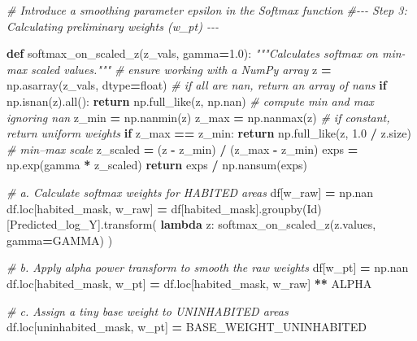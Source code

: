 \documentclass[
  12pt,
  oneside]{book}
\newenvironment{Shaded}{\begin{snugshade}}{\end{snugshade}}
\newcommand{\BuiltInTok}[1]{#1}
\newcommand{\CommentTok}[1]{\textcolor[rgb]{0.56,0.35,0.01}{\textit{#1}}}
\newcommand{\ControlFlowTok}[1]{\textcolor[rgb]{0.13,0.29,0.53}{\textbf{#1}}}
\newcommand{\FloatTok}[1]{\textcolor[rgb]{0.00,0.00,0.81}{#1}}
\newcommand{\KeywordTok}[1]{\textcolor[rgb]{0.13,0.29,0.53}{\textbf{#1}}}
\newcommand{\NormalTok}[1]{#1}
\newcommand{\OperatorTok}[1]{\textcolor[rgb]{0.81,0.36,0.00}{\textbf{#1}}}
\newcommand{\StringTok}[1]{\textcolor[rgb]{0.31,0.60,0.02}{#1}}
\begin{document}
\begin{Shaded}
\begin{Highlighting}[numbers=left,,]
\CommentTok{\# Introduce a smoothing parameter epsilon in the Softmax function}
\CommentTok{\#{-}{-}{-} Step 3: Calculating preliminary weights (w\_pt) {-}{-}{-}}

\KeywordTok{def}\NormalTok{ softmax\_on\_scaled\_z(z\_vals, gamma}\OperatorTok{=}\FloatTok{1.0}\NormalTok{):}
    \CommentTok{"""Calculates softmax on min{-}max scaled values."""}
    \CommentTok{\# ensure working with a NumPy array}
\NormalTok{    z }\OperatorTok{=}\NormalTok{ np.asarray(z\_vals, dtype}\OperatorTok{=}\BuiltInTok{float}\NormalTok{)}
    \CommentTok{\# if all are nan, return an array of nans}
    \ControlFlowTok{if}\NormalTok{ np.isnan(z).}\BuiltInTok{all}\NormalTok{():}
        \ControlFlowTok{return}\NormalTok{ np.full\_like(z, np.nan)}
    \CommentTok{\# compute min and max ignoring nan}
\NormalTok{    z\_min }\OperatorTok{=}\NormalTok{ np.nanmin(z)}
\NormalTok{    z\_max }\OperatorTok{=}\NormalTok{ np.nanmax(z)}
    \CommentTok{\# if constant, return uniform weights}
    \ControlFlowTok{if}\NormalTok{ z\_max }\OperatorTok{==}\NormalTok{ z\_min:}
        \ControlFlowTok{return}\NormalTok{ np.full\_like(z, }\FloatTok{1.0} \OperatorTok{/}\NormalTok{ z.size)}
    \CommentTok{\# min–max scale}
\NormalTok{    z\_scaled }\OperatorTok{=}\NormalTok{ (z }\OperatorTok{{-}}\NormalTok{ z\_min) }\OperatorTok{/}\NormalTok{ (z\_max }\OperatorTok{{-}}\NormalTok{ z\_min)}
\NormalTok{    exps }\OperatorTok{=}\NormalTok{ np.exp(gamma }\OperatorTok{*}\NormalTok{ z\_scaled)}
    \ControlFlowTok{return}\NormalTok{ exps }\OperatorTok{/}\NormalTok{ np.nansum(exps)}

\CommentTok{\# a. Calculate softmax weights for HABITED areas}
\NormalTok{df[}\StringTok{\textquotesingle{}w\_raw\textquotesingle{}}\NormalTok{] }\OperatorTok{=}\NormalTok{ np.nan}
\NormalTok{df.loc[habited\_mask, }\StringTok{\textquotesingle{}w\_raw\textquotesingle{}}\NormalTok{] }\OperatorTok{=}\NormalTok{ df[habited\_mask].groupby(}\StringTok{\textquotesingle{}Id\textquotesingle{}}\NormalTok{)}
\NormalTok{[}\StringTok{\textquotesingle{}Predicted\_log\_Y\textquotesingle{}}\NormalTok{].transform(}
    \KeywordTok{lambda}\NormalTok{ z: softmax\_on\_scaled\_z(z.values, gamma}\OperatorTok{=}\NormalTok{GAMMA)}
\NormalTok{)}

\CommentTok{\# b. Apply alpha power transform to smooth the raw weights}
\NormalTok{df[}\StringTok{\textquotesingle{}w\_pt\textquotesingle{}}\NormalTok{] }\OperatorTok{=}\NormalTok{ np.nan}
\NormalTok{df.loc[habited\_mask, }\StringTok{\textquotesingle{}w\_pt\textquotesingle{}}\NormalTok{] }\OperatorTok{=}\NormalTok{ df.loc[habited\_mask, }\StringTok{\textquotesingle{}w\_raw\textquotesingle{}}\NormalTok{] }\OperatorTok{**}\NormalTok{ ALPHA}

\CommentTok{\# c. Assign a tiny base weight to UNINHABITED areas}
\NormalTok{df.loc[uninhabited\_mask, }\StringTok{\textquotesingle{}w\_pt\textquotesingle{}}\NormalTok{] }\OperatorTok{=}\NormalTok{ BASE\_WEIGHT\_UNINHABITED}
\end{Highlighting}
\end{Shaded}
\end{document}
